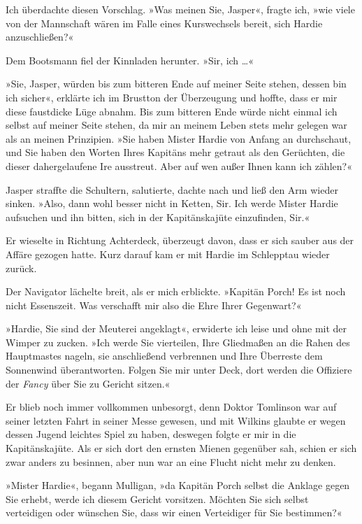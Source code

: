 Ich überdachte diesen Vorschlag. »Was meinen Sie, Jasper«, fragte
ich, »wie viele von der Mannschaft wären im Falle eines
Kurswechsels bereit, sich Hardie anzuschließen?«

Dem Bootsmann fiel der Kinnladen herunter. »Sir, ich \ldots{}«

»Sie, Jasper, würden bis zum bitteren Ende auf meiner Seite stehen,
dessen bin ich sicher«, erklärte ich im Brustton der Überzeugung
und hoffte, dass er mir diese faustdicke Lüge abnahm. Bis zum
bitteren Ende würde nicht einmal ich selbst auf meiner Seite
stehen, da mir an meinem Leben stets mehr gelegen war als an meinen
Prinzipien. »Sie haben Mister Hardie von Anfang an durchschaut, und
Sie haben den Worten Ihres Kapitäns mehr getraut als den Gerüchten,
die dieser dahergelaufene Ire ausstreut. Aber auf wen außer Ihnen
kann ich zählen?«

Jasper straffte die Schultern, salutierte, dachte nach und ließ den
Arm wieder sinken. »Also, dann wohl besser nicht in Ketten, Sir.
Ich werde Mister Hardie aufsuchen und ihn bitten, sich in der
Kapitänskajüte einzufinden, Sir.«

Er wieselte in Richtung Achterdeck, überzeugt davon, dass er sich
sauber aus der Affäre gezogen hatte. Kurz darauf kam er mit Hardie
im Schlepptau wieder zurück.

\bigpar

Der Navigator lächelte breit, als er mich erblickte. »Kapitän
Porch! Es ist noch nicht Essenszeit. Was verschafft mir also die
Ehre Ihrer Gegenwart?«

»Hardie, Sie sind der Meuterei angeklagt«, erwiderte ich leise und
ohne mit der Wimper zu zucken. »Ich werde Sie vierteilen, Ihre
Gliedmaßen an die Rahen des Hauptmastes nageln, sie anschließend
verbrennen und Ihre Überreste dem Sonnenwind überantworten. Folgen
Sie mir unter Deck, dort werden die Offiziere der \emph{Fancy} über
Sie zu Gericht sitzen.«

Er blieb noch immer vollkommen unbesorgt, denn Doktor Tomlinson war
auf seiner letzten Fahrt in seiner Messe gewesen, und mit Wilkins
glaubte er wegen dessen Jugend leichtes Spiel zu haben, deswegen
folgte er mir in die Kapitänskajüte. Als er sich dort den ernsten
Mienen gegenüber sah, schien er sich zwar anders zu besinnen, aber
nun war an eine Flucht nicht mehr zu denken.

»Mister Hardie«, begann Mulligan, »da Kapitän Porch selbst die
Anklage gegen Sie erhebt, werde ich diesem Gericht vorsitzen.
Möchten Sie sich selbst verteidigen oder wünschen Sie, dass wir
einen Verteidiger für Sie bestimmen?«

